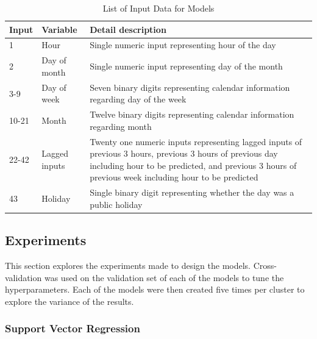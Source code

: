 \begin{table}
	\caption{List of Input Data for Models}
	\label{appendix:feature}
	\begin{tabular}{p{1cm}p{1.8cm}p{4.8cm}}
		\toprule
		Input & Variable      & Detail description \\
		\midrule
		1     & Hour          & Single numeric input representing hour of the day                                                                                              \\
		2     & Day of month  & Single numeric input representing day of the month                                                                                             \\
		3-9   & Day of week   & Seven binary digits representing calendar information regarding day of the week                                                                                            \\
		10-21 & Month         & Twelve binary digits representing calendar information regarding month                                                                                         \\
		22-42 & Lagged inputs & Twenty one numeric inputs representing lagged inputs of previous 3 hours, previous 3 hours of previous day including hour to be predicted, and previous 3 hours of previous week including hour to be predicted \\
		43    & Holiday       & Single binary digit representing whether the day was a public holiday  \\     \bottomrule                                                           
	\end{tabular}
\end{table}

\subsection{Experiments}

This section explores the experiments made to design the models. Cross-validation was used on the validation set of each of the models to tune the hyperparameters. Each of the models were then created five times per cluster to explore the variance of the results.

\subsubsection{Support Vector Regression}

